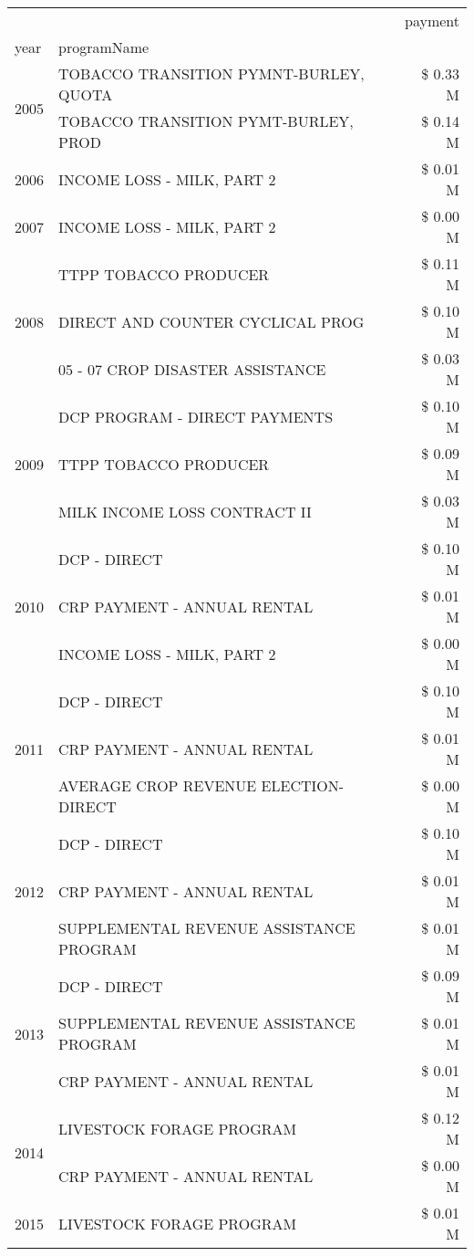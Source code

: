 \begin{tabular}{llr}
\toprule
 &  & payment \\
year & programName &  \\
\midrule
\multirow[t]{2}{*}{2005} & TOBACCO TRANSITION PYMNT-BURLEY, QUOTA & \$ 0.33 M \\
 & TOBACCO TRANSITION PYMT-BURLEY, PROD & \$ 0.14 M \\
\cline{1-3}
2006 & INCOME LOSS - MILK, PART 2 & \$ 0.01 M \\
\cline{1-3}
2007 & INCOME LOSS - MILK, PART 2 & \$ 0.00 M \\
\cline{1-3}
\multirow[t]{3}{*}{2008} & TTPP TOBACCO PRODUCER & \$ 0.11 M \\
 & DIRECT AND COUNTER CYCLICAL PROG & \$ 0.10 M \\
 & 05 - 07 CROP DISASTER ASSISTANCE & \$ 0.03 M \\
\cline{1-3}
\multirow[t]{3}{*}{2009} & DCP PROGRAM - DIRECT PAYMENTS & \$ 0.10 M \\
 & TTPP TOBACCO PRODUCER & \$ 0.09 M \\
 & MILK INCOME LOSS CONTRACT II & \$ 0.03 M \\
\cline{1-3}
\multirow[t]{3}{*}{2010} & DCP - DIRECT & \$ 0.10 M \\
 & CRP PAYMENT - ANNUAL RENTAL & \$ 0.01 M \\
 & INCOME LOSS - MILK, PART 2 & \$ 0.00 M \\
\cline{1-3}
\multirow[t]{3}{*}{2011} & DCP - DIRECT & \$ 0.10 M \\
 & CRP PAYMENT - ANNUAL RENTAL & \$ 0.01 M \\
 & AVERAGE CROP REVENUE ELECTION-DIRECT & \$ 0.00 M \\
\cline{1-3}
\multirow[t]{3}{*}{2012} & DCP - DIRECT & \$ 0.10 M \\
 & CRP PAYMENT - ANNUAL RENTAL & \$ 0.01 M \\
 & SUPPLEMENTAL REVENUE ASSISTANCE PROGRAM & \$ 0.01 M \\
\cline{1-3}
\multirow[t]{3}{*}{2013} & DCP - DIRECT & \$ 0.09 M \\
 & SUPPLEMENTAL REVENUE ASSISTANCE PROGRAM & \$ 0.01 M \\
 & CRP PAYMENT - ANNUAL RENTAL & \$ 0.01 M \\
\cline{1-3}
\multirow[t]{2}{*}{2014} & LIVESTOCK FORAGE PROGRAM & \$ 0.12 M \\
 & CRP PAYMENT - ANNUAL RENTAL & \$ 0.00 M \\
\cline{1-3}
\multirow[t]{2}{*}{2015} & LIVESTOCK FORAGE PROGRAM & \$ 0.01 M \\

\end{tabular}

